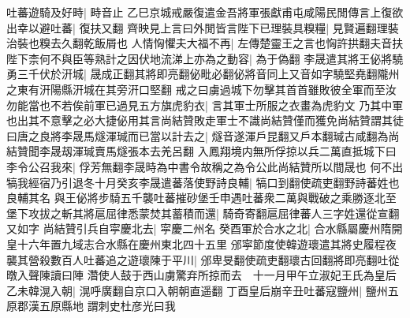 吐蕃遊騎及好畤|{
	畤音止}
乙巳京城戒嚴復遣金吾將軍張獻甫屯咸陽民閒傳言上復欲出幸以避吐蕃|{
	復扶又翻}
齊映見上言曰外閒皆言陛下已理裝具糗糧|{
	見賢遍翻理裝治裝也糗去久翻乾飯屑也}
人情恟懼夫大福不再|{
	左傳楚靈王之言也恟許拱翻夫音扶}
陛下柰何不與臣等熟計之因伏地流涕上亦為之動容|{
	為于偽翻}
李晟遣其將王佖將驍勇三千伏於汧城|{
	晟成正翻其將即亮翻佖毗必翻佖將音同上又音如字驍堅堯翻隴州之東有汧陽縣汧城在其旁汧口堅翻}
戒之曰虜過城下勿擊其首首雖敗彼全軍而至汝勿能當也不若俟前軍已過見五方旗虎豹衣|{
	言其軍士所服之衣畫為虎豹文}
乃其中軍也出其不意擊之必大捷佖用其言尚結贊敗走軍士不識尚結贊僅而獲免尚結贊謂其徒曰唐之良將李晟馬燧渾瑊而已當以計去之|{
	燧音遂渾戶昆翻又戶本翻瑊古咸翻為尚結贊聞李晟刼渾瑊賣馬燧張本去羌呂翻}
入鳳翔境内無所俘掠以兵二萬直抵城下曰李令公召我來|{
	俘芳無翻李晟時為中書令故稱之為令公此尚結贊所以間晟也}
何不出犒我經宿乃引退冬十月癸亥李晟遣蕃落使野詩良輔|{
	犒口到翻使疏吏翻野詩蕃姓也良輔其名}
與王佖將步騎五千襲吐蕃摧砂堡壬申遇吐蕃衆二萬與戰破之乘勝逐北至堡下攻拔之斬其將扈屈律悉蒙焚其蓄積而還|{
	騎奇寄翻扈屈律蕃人三字姓還從宣翻又如字}
尚結贊引兵自寜慶北去|{
	寜慶二州名}
癸酉軍於合水之北|{
	合水縣屬慶州隋開皇十六年置九域志合水縣在慶州東北四十五里}
邠寜節度使韓遊瓌遣其將史履程夜襲其營殺數百人吐蕃追之遊瓌陳于平川|{
	邠卑旻翻使疏吏翻瓌古回翻將即亮翻吐從暾入聲陳讀曰陣}
濳使人鼓于西山虜驚弃所掠而去　十一月甲午立淑妃王氏為皇后　乙未韓滉入朝|{
	滉呼廣翻自京口入朝朝直遥翻}
丁酉皇后崩辛丑吐蕃寇鹽州|{
	鹽州五原郡漢五原縣地}
謂刺史杜彦光曰我

